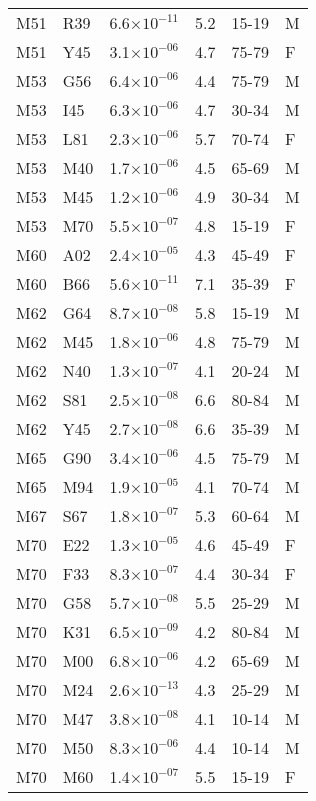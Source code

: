 \begin{longtable}{lllrll}
   M51 & R39 & 6.6$\times10^{-11}$ & 5.2 & 15-19 & M \\ 
   M51 & Y45 & 3.1$\times10^{-06}$ & 4.7 & 75-79 & F \\ 
   M53 & G56 & 6.4$\times10^{-06}$ & 4.4 & 75-79 & M \\ 
   M53 & I45 & 6.3$\times10^{-06}$ & 4.7 & 30-34 & M \\ 
   M53 & L81 & 2.3$\times10^{-06}$ & 5.7 & 70-74 & F \\ 
   M53 & M40 & 1.7$\times10^{-06}$ & 4.5 & 65-69 & M \\ 
   M53 & M45 & 1.2$\times10^{-06}$ & 4.9 & 30-34 & M \\ 
   M53 & M70 & 5.5$\times10^{-07}$ & 4.8 & 15-19 & F \\ 
   M60 & A02 & 2.4$\times10^{-05}$ & 4.3 & 45-49 & F \\ 
   M60 & B66 & 5.6$\times10^{-11}$ & 7.1 & 35-39 & F \\ 
   M62 & G64 & 8.7$\times10^{-08}$ & 5.8 & 15-19 & M \\ 
   M62 & M45 & 1.8$\times10^{-06}$ & 4.8 & 75-79 & M \\ 
   M62 & N40 & 1.3$\times10^{-07}$ & 4.1 & 20-24 & M \\ 
   M62 & S81 & 2.5$\times10^{-08}$ & 6.6 & 80-84 & M \\ 
   M62 & Y45 & 2.7$\times10^{-08}$ & 6.6 & 35-39 & M \\ 
   M65 & G90 & 3.4$\times10^{-06}$ & 4.5 & 75-79 & M \\ 
   M65 & M94 & 1.9$\times10^{-05}$ & 4.1 & 70-74 & M \\ 
   M67 & S67 & 1.8$\times10^{-07}$ & 5.3 & 60-64 & M \\ 
   M70 & E22 & 1.3$\times10^{-05}$ & 4.6 & 45-49 & F \\ 
   M70 & F33 & 8.3$\times10^{-07}$ & 4.4 & 30-34 & F \\ 
   M70 & G58 & 5.7$\times10^{-08}$ & 5.5 & 25-29 & M \\ 
   M70 & K31 & 6.5$\times10^{-09}$ & 4.2 & 80-84 & M \\ 
   M70 & M00 & 6.8$\times10^{-06}$ & 4.2 & 65-69 & M \\ 
   M70 & M24 & 2.6$\times10^{-13}$ & 4.3 & 25-29 & M \\ 
   M70 & M47 & 3.8$\times10^{-08}$ & 4.1 & 10-14 & M \\ 
   M70 & M50 & 8.3$\times10^{-06}$ & 4.4 & 10-14 & M \\ 
   M70 & M60 & 1.4$\times10^{-07}$ & 5.5 & 15-19 & F \\ 

\end{longtable}

